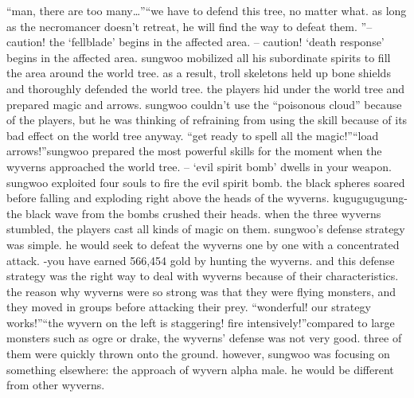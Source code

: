 “man, there are too many…”“we have to defend this tree, no matter what.
 as long as the necromancer doesn’t retreat, he will find the way to defeat them.
”– caution! the ‘fellblade’ begins in the affected area.
– caution! ‘death response’ begins in the affected area.
sungwoo mobilized all his subordinate spirits to fill the area around the world tree.
 as a result, troll skeletons held up bone shields and thoroughly defended the world tree.
 the players hid under the world tree and prepared magic and arrows.
sungwoo couldn’t use the “poisonous cloud” because of the players, but he was thinking of refraining from using the skill because of its bad effect on the world tree anyway.
“get ready to spell all the magic!”“load arrows!”sungwoo prepared the most powerful skills for the moment when the wyverns approached the world tree.
– ‘evil spirit bomb’ dwells in your weapon.
sungwoo exploited four souls to fire the evil spirit bomb.
 the black spheres soared before falling and exploding right above the heads of the wyverns.
kugugugugung-the black wave from the bombs crushed their heads.
 when the three wyverns stumbled, the players cast all kinds of magic on them.
sungwoo’s defense strategy was simple.
 he would seek to defeat the wyverns one by one with a concentrated attack.
-you have earned 566,454 gold by hunting the wyverns.
and this defense strategy was the right way to deal with wyverns because of their characteristics.
 the reason why wyverns were so strong was that they were flying monsters, and they moved in groups before attacking their prey.
“wonderful! our strategy works!”“the wyvern on the left is staggering! fire intensively!”compared to large monsters such as ogre or drake, the wyverns’ defense was not very good.
 three of them were quickly thrown onto the ground.
however, sungwoo was focusing on something elsewhere: the approach of wyvern alpha male.
 he would be different from other wyverns.

